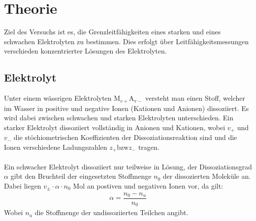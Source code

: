 \documentclass[12pt,a4paper,titlepage,headinclude,bibtotoc]{scrartcl}
\begin{document}
\begin{titlepage}

\end{titlepage}

\tableofcontents

\newpage

\section{Theorie}
Ziel des Versuchs ist es, die Grenzleitfähigkeiten eines starken und eines schwachen Elektrolyten zu bestimmen. Dies erfolgt über Leitfähigkeitsmessungen verschieden konzentrierter Lösungen des Elektrolyten.
\subsection{Elektrolyt}
Unter einem wässrigen Elektrolyten $\mathrm{M}_{v+}\mathrm{A_{v-}}$ versteht man einen Stoff, welcher im Wasser in positive und negative Ionen (Kationen und Anionen) dissoziiert. Es wird dabei zwischen schwachen und starken Elektrolyten unterschieden. Ein starker Elektrolyt dissoziiert vollständig in Anionen und Kationen, wobei $v_+$ und $v_-$ die stöchiometrischen Koeffizienten der Dissoziationsreaktion sind und die Ionen verschiedene Ladungszahlen $z_+\mathrm{bzw} z_-$ tragen.\\\\
Ein schwacher Elektrolyt dissoziiert nur teilweise in Lösung, der Dissoziationsgrad $\alpha $ gibt den Bruchteil der eingesetzten Stoffmenge $n_0$ der dissozierten Moleküle an. Dabei liegen $v_{\pm } \cdot \alpha \cdot n_0$ Mol an postiven und negativen Ionen vor, da gilt:
\begin{align}
\alpha = \dfrac{n_0 - n_u}{n_0}
\end{align} 
Wobei $n_u$ die Stoffmenge der undissoziierten Teilchen angibt.
\end{document}
